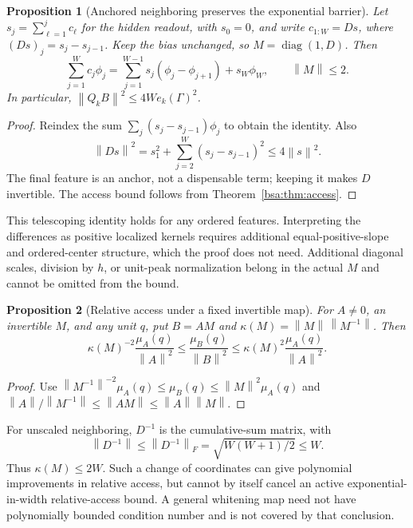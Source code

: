 \documentclass[11pt,letterpaper]{article}
\newcommand{\bsaNorm}[1]{\left\lVert #1\right\rVert}
\DeclareMathOperator{\bsaDiag}{diag}
\newtheorem{bsaProposition}{Proposition}[section]
\theoremstyle{remark}
\theoremstyle{plain}
\begin{document}
\begin{bsaProposition}[Anchored neighboring preserves the exponential barrier]
\label{bsa:prop:neighboring}
Let $s_j=\sum_{\ell=1}^j c_\ell$ for the hidden readout, with $s_0=0$, and write $c_{1:W}=Ds$, where
$ (Ds)_j=s_j-s_{j-1}$. Keep the bias unchanged, so $M=\bsaDiag(1,D)$. Then
\begin{equation}
 \sum_{j=1}^Wc_j\phi_j
 =\sum_{j=1}^{W-1}s_j(\phi_j-\phi_{j+1})+s_W\phi_W,
 \qquad \bsaNorm M\le2.
 \label{bsa:eq:neighboring}
\end{equation}
In particular, $\bsaNorm{Q_kB}^2\le4W e_k(\Gamma)^2$.
\end{bsaProposition}
\begin{proof}
Reindex the sum $\sum_j(s_j-s_{j-1})\phi_j$ to obtain the identity. Also
\[
 \bsaNorm{Ds}^2=s_1^2+\sum_{j=2}^W(s_j-s_{j-1})^2\le4\bsaNorm s^2.
\]
The final feature is an anchor, not a dispensable term; keeping it makes $D$ invertible. The access bound follows from Theorem~\ref{bsa:thm:access}.
\end{proof}

This telescoping identity holds for any ordered features. Interpreting the differences as positive localized kernels requires additional equal-positive-slope and ordered-center structure, which the proof does not need. Additional diagonal scales, division by $h$, or unit-peak normalization belong in the actual $M$ and cannot be omitted from the bound.

\begin{bsaProposition}[Relative access under a fixed invertible map]
\label{bsa:prop:relative-access}
For $A\ne0$, an invertible $M$, and any unit $q$, put $B=AM$ and
$\kappa(M)=\bsaNorm M\,\bsaNorm{M^{-1}}$. Then
\begin{equation}
 \kappa(M)^{-2}\frac{\mu_A(q)}{\bsaNorm A^2}
 \le\frac{\mu_B(q)}{\bsaNorm B^2}
 \le\kappa(M)^2\frac{\mu_A(q)}{\bsaNorm A^2}.
 \label{bsa:eq:relative-access}
\end{equation}
\end{bsaProposition}
\begin{proof}
Use $\bsaNorm{M^{-1}}^{-2}\mu_A(q)\le\mu_B(q)\le\bsaNorm M^2\mu_A(q)$ and
$\bsaNorm A/\bsaNorm{M^{-1}}\le\bsaNorm{AM}\le\bsaNorm A\bsaNorm M$.
\end{proof}
For unscaled neighboring, $D^{-1}$ is the cumulative-sum matrix, with
\[
 \bsaNorm{D^{-1}}\le\bsaNorm{D^{-1}}_F=\sqrt{W(W+1)/2}\le W.
\]
Thus $\kappa(M)\le2W$. Such a change of coordinates can give polynomial improvements in relative access, but cannot by itself cancel an active exponential-in-width relative-access bound. A general whitening map need not have polynomially bounded condition number and is not covered by that conclusion.
\end{document}

